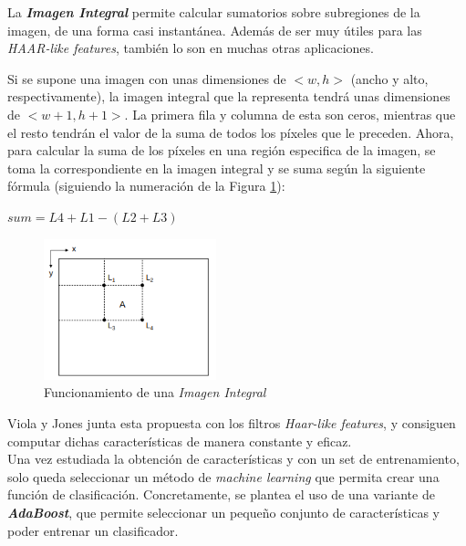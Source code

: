 La \textbf{\textit{Imagen Integral}} permite calcular sumatorios sobre subregiones de la imagen, de una forma casi instantánea. Además de ser muy útiles para las \textit{HAAR-like features}, también lo son en muchas otras aplicaciones.

Si se supone una imagen con unas dimensiones de $<w,h>$ (ancho y alto, respectivamente), la imagen integral que la representa tendrá unas dimensiones de $<w+1,h+1>$. La primera fila y columna de esta son ceros, mientras que el resto tendrán el valor de la suma de todos los píxeles que le preceden. \cite{integral-web} Ahora, para calcular la suma de los píxeles en una región especifica de la imagen, se toma la correspondiente en la imagen integral y se suma según la siguiente fórmula (siguiendo la numeración de la Figura \ref{fig:integral}):
\begin{center}
	$sum = L4 + L1 - (L2 + L3)$ 
\end{center}
\begin{figure}[htp]
	\centering
	\includegraphics[width=5cm]{imagenes/integral.png}
	\caption{Funcionamiento de una \textit{Imagen Integral}}
	\label{fig:integral}
\end{figure}

Viola y Jones junta esta propuesta con los filtros \textit{Haar-like features}, y consiguen computar dichas características de manera constante y eficaz. \cite{integral}\\


%
\newpage
Una vez estudiada la obtención de características y con un set de entrenamiento, solo queda seleccionar un método de \textit{machine learning} que permita crear una función de clasificación. Concretamente, se plantea el uso de una variante de \textbf{\textit{AdaBoost}}, que permite seleccionar un pequeño conjunto de características y poder entrenar un clasificador. 

